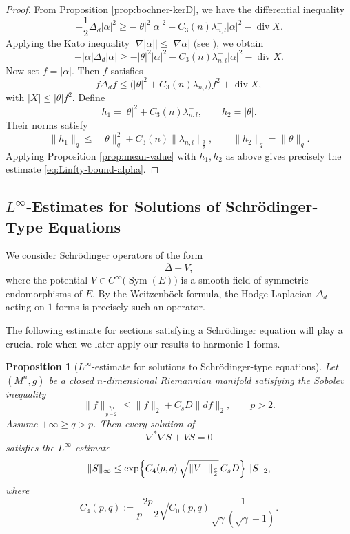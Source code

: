 \documentclass[12pt, twoside]{article}
\newtheorem{proposition}[theorem]{Proposition}
\theoremstyle{definition}
\numberwithin{equation}{section}
\def \la {\lambda}
\begin{document}
	\begin{proof}
		From Proposition \ref{prop:bochner-kerD}, we have the differential inequality
		\[
		-\frac{1}{2}\Delta_{d}|\alpha|^{2}
		\ge-|\theta|^{2}|\alpha|^{2}-C_3(n)\la^{-}_{n,l}|\alpha|^{2}-\operatorname{div}X.
		\]
		Applying the Kato inequality \(|\nabla|\alpha||\le|\nabla\alpha|\) (see \cite{Berard1988}), we obtain
		\[
		-|\alpha|\Delta_{d}|\alpha|
		\ge-|\theta|^{2}|\alpha|^{2}-C_3(n)\la^{-}_{n,l}|\alpha|^{2}-\operatorname{div}X.
		\]    
			Now set \(f=|\alpha|\). Then \(f\) satisfies
		\[
		f\Delta_{d}f\le\bigl(|\theta|^{2}+C_3(n)\la^{-}_{n,l}\bigr)f^{2}+\operatorname{div}X,
		\]
		with \(|X|\le|\theta|f^{2}\). Define
		\[
		h_{1}=|\theta|^{2}+C_3(n)\la^{-}_{n,l},\qquad h_{2}=|\theta|.
		\]
	   Their norms satisfy
	\[
	\|h_{1}\|_{q}\le \|\theta\|_{q}^{2}+C_{3}(n)\|\lambda^{-}_{n,l}\|_{\frac{q}{2}},
	\qquad
	\|h_{2}\|_{q}= \|\theta\|_{q}.
	\]
	Applying Proposition \ref{prop:mean-value} with \(h_{1},h_{2}\) as above gives precisely the estimate \eqref{eq:Linfty-bound-alpha}.
	\end{proof}
	
	\subsection{\(L^{\infty}\)-Estimates for Solutions of Schr\"odinger-Type Equations}
We consider Schrödinger operators of the form 
\[
\overline{\Delta} + V,
\]
where the potential \(V \in C^\infty\bigl(\operatorname{Sym}(E)\bigr)\) is a smooth field of symmetric endomorphisms of \(E\). By the Weitzenböck formula, the Hodge Laplacian \(\Delta_{d}\) acting on \(1\)-forms is precisely such an operator.

The following estimate for sections satisfying a Schrödinger equation will play a crucial role when we later apply our results to harmonic \(1\)-forms.
	\begin{proposition}[\(L^{\infty}\)-estimate for solutions to Schrödinger-type equations]\label{prop:schrodinger-Linfty}
		Let \((M^{n},g)\) be a closed \(n\)-dimensional Riemannian manifold satisfying the Sobolev inequality
		\[
		\|f\|_{\frac{2p}{p-2}} \le \|f\|_{2} + C_{s}D \|df\|_{2}, \qquad p>2.
		\]
		Assume \(+\infty \ge q > p\). Then every solution of
		\[
		\nabla^{*}\nabla S + V S = 0
		\]
		satisfies the \(L^\infty\)-estimate
		\begin{equation}\label{eq:schrodinger-bound}
		\|S\|_{\infty}
		\le \exp\Bigl\{ C_4(p,q)\,\sqrt{\|V^{-}\|_{\frac{q}{2}}}\,C_{s}D \Bigr\} \, \|S\|_{2},
		\end{equation}
		where \[C_4(p,q):= \frac{2p}{p-2}\sqrt{C_{0}(p,q)} 
		\frac{1}{\sqrt{\gamma}(\sqrt{\gamma}-1)}. \]
	\end{proposition}
	
\end{document}
